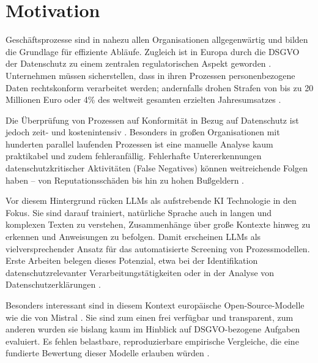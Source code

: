 \section{Motivation}\label{sec:motivation}

Geschäftsprozesse sind in nahezu allen Organisationen allgegenwärtig und bilden die Grundlage für effiziente Abläufe. Zugleich ist in Europa durch die \ac{DSGVO} der Datenschutz zu einem zentralen regulatorischen Aspekt geworden \cite{Capodieci2023BPMNEnabledDP, GDPR2016}. Unternehmen müssen sicherstellen, dass in ihren Prozessen personenbezogene Daten rechtskonform verarbeitet werden; andernfalls drohen Strafen von bis zu 20 Millionen Euro oder 4\% des weltweit gesamten erzielten Jahresumsatzes \cite{GDPR2016}.


Die Überprüfung von Prozessen auf Konformität in Bezug auf Datenschutz ist jedoch zeit- und kostenintensiv \cite{nake2023towards, varela2025business}. Besonders in großen Organisationen mit hunderten parallel laufenden Prozessen ist eine manuelle Analyse kaum praktikabel und zudem fehleranfällig. Fehlerhafte Untererkennungen datenschutzkritischer Aktivitäten (False Negatives) können weitreichende Folgen haben – von Reputationsschäden bis hin zu hohen Bußgeldern \cite{nake2023towards}.


Vor diesem Hintergrund rücken \acp{LLM} als aufstrebende \ac{KI} Technologie in den Fokus. Sie sind darauf trainiert, natürliche Sprache auch in langen und komplexen Texten zu verstehen, Zusammenhänge über große Kontexte hinweg zu erkennen und Anweisungen zu befolgen. Damit erscheinen \acp{LLM} als vielversprechender Ansatz für das automatisierte Screening von Prozessmodellen. Erste Arbeiten belegen dieses Potenzial, etwa bei der Identifikation datenschutzrelevanter Verarbeitungstätigkeiten oder in der Analyse von Datenschutzerklärungen \cite{ciaramella2022leveraging, pragyan2024toward}.


Besonders interessant sind in diesem Kontext europäische Open-Source-Modelle wie die von Mistral \cite{mistralai}. Sie sind zum einen frei verfügbar und transparent, zum anderen wurden sie bislang kaum im Hinblick auf \ac{DSGVO}-bezogene Aufgaben evaluiert. Es fehlen belastbare, reproduzierbare empirische Vergleiche, die eine fundierte Bewertung dieser Modelle erlauben würden \cite{schwerin2024systematic}.


